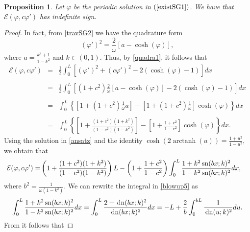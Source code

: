 \documentclass[12pt,reqno,a4paper]{amsart} %
\newcommand{\sn}{{\rm \,sn}}
\newcommand{\dn}{{\rm \,dn}}
\numberwithin{equation}{section}
\numberwithin{figure}{section}
\newtheorem{proposition}[theorem]{Proposition}
\begin{document}
  \begin{proposition}\label{propEphi} Let $\varphi$ be the periodic solution in $(\ref{existSG1})$. We have that $\mathcal{E}(\varphi,c\varphi')$ has indefinite sign. 
 \end{proposition}
 \begin{proof}	In fact, from \eqref{travSG2} we have the quadrature form
 	\begin{equation}\label{quadra1}
 		( \varphi')^2= \frac{2}{\omega}[a-\cosh(\varphi)], 
 	\end{equation}
 	where $a=\displaystyle\frac{k^2+1}{1-k^2}$ and $k\in (0,1)$. Thus, by \eqref{quadra1}, it follows that 	
 	 	\begin{equation}\begin{array}{lllll} 
 			\mathcal{E}(\varphi, c\varphi')
 			&=&\displaystyle\frac{1}{2}\int_{0}^{L} \left[(\varphi ')^2+(c\varphi')^2-2(\cosh(\varphi)-1)\right] dx\\\\
 			&= & \displaystyle\frac{1}{2}\int_{0}^{L} \left[(1+c^2)\frac{2}{\omega}[a-\cosh(\varphi)]-2(\cosh(\varphi)-1)\right] dx\\\\
 			&=& \displaystyle \int_{0}^{L} \left\{\left[1+(1+c^2)\frac{1}{\omega}a\right]-\left[ 1+(1+c^2)\frac{1}{\omega}\right]\cosh(\varphi) \right\}dx\\\\
 			& = & \displaystyle \int_{0}^{L} \left\{\left[1+ \frac{(1+c^2)(1+k^2)}{(1-c^2)(1-k^2)}\right]-\left[1+\frac{1+c^2}{1-c^2}\right]\cosh(\varphi) \right\} dx.
 	\end{array}\end{equation}
 	Using the solution in \eqref{ansatz} and the identity $\displaystyle\cosh(2\operatorname{arctanh}(u))=\frac{1+u^2}{1-u^2}$, we obtain that 
 	\begin{align} \label{blowup5}
 		\mathcal{E}(\varphi, c\varphi')
 		=&  \left( 1+ \frac{(1+c^2)(1+k^2)}{(1-c^2)(1-k^2)}\right) L -\left(1+\frac{1+c^2}{1-c^2}\right)\int_{0}^{L} \frac{1+k ^2\sn (bx ;k )^2}{1-k^2 \sn (bx ;k )^2}  dx ,
 	\end{align}
 	where $b^2=\displaystyle\frac{1}{\omega(1-k^2)}$.   We can rewrite the integral in \eqref{blowup5} as
 	\begin{align} \label{blowup6}
 		\int_{0}^{L} \frac{1+k ^2\sn (bx ;k )^2}{1-k^2 \sn (bx ;k )^2}  dx =	\int_{0}^{L} \frac{2-\dn (bx ;k )^2}{ \dn (bx ;k )^2}  dx =-L+\frac{2}{b}	\int_{0}^{bL} \frac{1}{ \dn (u ;k )^2}  du .
 	\end{align} From \cite[Formula 315.02]{byrd} it follows that	

\end{proof}
\end{document}
